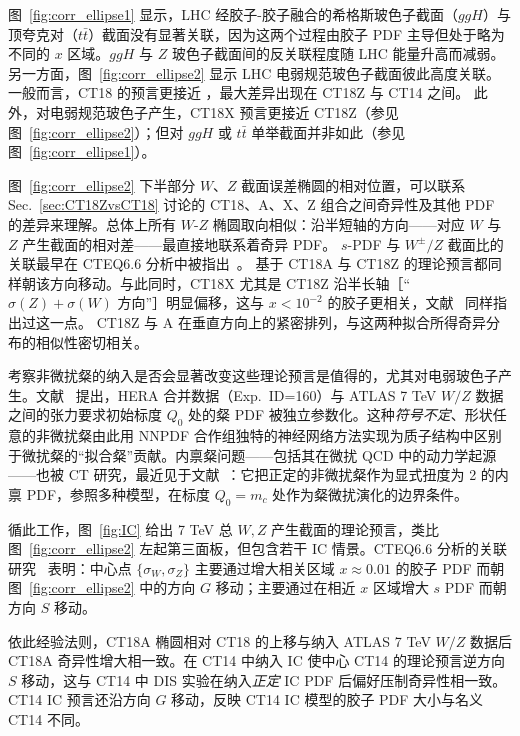 图~\ref{fig:corr_ellipse1} 显示，LHC 经胶子-胶子融合的希格斯玻色子截面（$ggH$）与顶夸克对（$t \bar t$）截面没有显著关联，因为这两个过程由胶子 PDF 主导但处于略为不同的 $x$ 区域。$ggH$ 与 $Z$ 玻色子截面间的反关联程度随 LHC 能量升高而减弱。
另一方面，图~\ref{fig:corr_ellipse2} 显示 LHC 电弱规范玻色子截面彼此高度关联。
一般而言，CT18 的预言更接近 \CTHERAII，最大差异出现在 CT18Z 与 CT14 之间。
此外，对电弱规范玻色子产生，CT18X 预言更接近 CT18Z（参见图~\ref{fig:corr_ellipse2}）；但对 $ggH$ 或 $t \bar t$ 单举截面并非如此（参见图~\ref{fig:corr_ellipse1}）。

图~\ref{fig:corr_ellipse2} 下半部分 $W$、$Z$ 截面误差椭圆的相对位置，可以联系 Sec.~\ref{sec:CT18ZvsCT18} 讨论的 CT18、A、X、Z 组合之间奇异性及其他 PDF 的差异来理解。总体上所有 $W$-$Z$ 椭圆取向相似：沿半短轴的方向——对应 $W$ 与
$Z$ 产生截面的相对差——最直接地联系着奇异 PDF。
$s$-PDF 与 $W^\pm/Z$ 截面比的关联最早在 CTEQ6.6 分析中被指出~\cite{Nadolsky:2008zw}。
基于
CT18A 与 CT18Z 的理论预言都同样朝该方向移动。与此同时，CT18X 尤其是 CT18Z 沿半长轴［``$\sigma(Z)\!+\!\sigma(W)$ 方向''］明显偏移，这与 $x<10^{-2}$ 的胶子更相关，文献~\cite{Nadolsky:2008zw} 同样指出过这一点。
CT18Z 与 A 在垂直方向上的紧密排列，与这两种拟合所得奇异分布的相似性密切相关。

考察非微扰粲的纳入是否会显著改变这些理论预言是值得的，尤其对电弱玻色子产生。文献~\cite{Ball:2017nwa} 提出，HERA 合并数据（Exp.~ID=160）与 ATLAS 7 TeV $W/Z$ 数据之间的张力要求初始标度 $Q_0$ 处的粲 PDF 被独立参数化。这种{\it 符号不定}、形状任意的非微扰粲由此用 NNPDF 合作组独特的神经网络方法实现为质子结构中区别于微扰粲的``拟合粲''贡献。内禀粲问题——包括其在微扰 QCD 中的动力学起源——也被 CT 研究，最近见于文献~\cite{Hou:2017khm}：它把正定的非微扰粲作为显式扭度为 2 的内禀 PDF，参照多种模型，在标度 $Q_0=m_c$ 处作为粲微扰演化的边界条件。

循此工作，图~\ref{fig:IC} 给出 7 TeV 总 $W,Z$ 产生截面的理论预言，类比图~\ref{fig:corr_ellipse2} 左起第三面板，但包含若干 IC 情景。CTEQ6.6 分析的关联研究~\cite{Nadolsky:2008zw} 表明：中心点 $\{\sigma_W, \sigma_Z\}$ 主要通过增大相关区域 $x\approx 0.01$ 的胶子 PDF 而朝图~\ref{fig:corr_ellipse2} 中的方向 $G$ 移动；主要通过在相近 $x$ 区域增大 $s$ PDF 而朝方向 $S$ 移动。

依此经验法则，CT18A 椭圆相对 CT18 的上移与纳入 ATLAS 7 TeV $W/Z$ 数据后 CT18A 奇异性增大相一致。在 CT14 中纳入 IC 使中心 CT14 的理论预言逆方向 $S$ 移动，这与 CT14 中 DIS 实验在纳入{\it 正定} IC PDF 后偏好压制奇异性相一致。CT14 IC 预言还沿方向 $G$ 移动，反映 CT14 IC 模型的胶子 PDF 大小与名义 CT14 不同。


